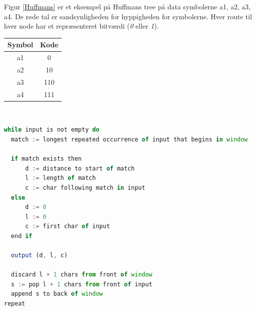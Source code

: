\documentclass[12pt]{article}
\begin{document}
Figur \ref{Huffmans} er et eksempel på Huffmans tree på data symbolerne a1, a2, a3, a4. De røde tal er sandsynligheden for hyppigheden for symbolerne. 
Hver route til hver node har et repræsenteret bitværdi (\textit{0} eller \textit{1}).  
\begin{table}[ht]
  \centering
  \begin{tabular}{ |c|c| }
   \hline
   \textbf{Symbol} & \textbf{Kode} \\
   \hline
   a1 &  0  \\
   \hline
   a2 & 10  \\
   \hline
   a3 &  110 \\
   \hline
   a4 &  111 \\
   \hline
  \end{tabular}\\
\end{table}

\begin{lstlisting}[language=JavaScript, caption=LZ77 Pseudocode teoritisk]
while input is not empty do
  match := longest repeated occurrence of input that begins in window
  
  if match exists then
      d := distance to start of match
      l := length of match
      c := char following match in input
  else
      d := 0
      l := 0
      c := first char of input
  end if
  
  output (d, l, c)
  
  discard l + 1 chars from front of window
  s := pop l + 1 chars from front of input
  append s to back of window
repeat

\end{lstlisting}
\printbibliography[title={Litteraturliste}]
\end{document}
